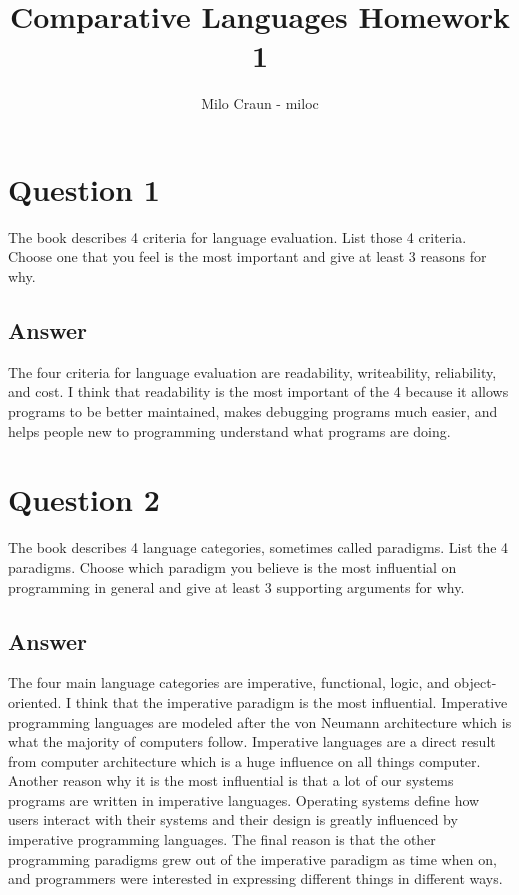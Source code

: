 \documentclass{article}
\author{Milo Craun - miloc}
\title{Comparative Languages Homework 1}
\begin{document}
\maketitle

\section*{Question 1}
The book describes 4 criteria for language evaluation. List those 4 criteria. Choose one that you feel is the most important and give at least 3 reasons for why.

\subsection*{Answer}
The four criteria for language evaluation are readability, writeability, reliability, and cost. I think that readability is the most important of the 4 because it allows programs to be better maintained, makes debugging programs much easier, and helps people new to programming understand what programs are doing.

\section*{Question 2}
The book describes 4 language categories, sometimes called paradigms. List the 4 paradigms. Choose which paradigm you believe is the most influential on programming in general and give at least 3 supporting arguments for why.

\subsection*{Answer}
The four main language categories are imperative, functional, logic, and object-oriented.
I think that the imperative paradigm is the most influential.
Imperative programming languages are modeled after the von Neumann architecture which is what the majority of computers follow. Imperative languages are a direct result from computer architecture which is a huge influence on all things computer. Another reason why it is the most influential is that a lot of our systems programs are written in imperative languages. Operating systems define how users interact with their systems and their design is greatly influenced by imperative programming languages.
The final reason is that the other programming paradigms grew out of the imperative paradigm as time when on, and programmers were interested in expressing different things in different ways.
\end{document}
